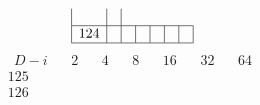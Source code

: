\documentclass{article}
\begin{document}
{$$\begin{array}{|r|*{6}{r|}}
 & 
\\
\hline
124 
 & 
 & 
 & 
 & 
 & 
 & 
\\
\hline
\end{array}
$$
$$
\begin{array}{|r|*{6}{r|}}
\hline
\ \ D-i \ \ &\ \ 2\ \ &\ \ 4\ \ &\ \ 8\ \ &\ \ 16\ \ &\ \ 32\ \ &\ \ 64\ \ \\
\hline
125 
 & 
 & 
 & 
 & 
 & 
 & 
\\
\hline
126 
 & 

\end{array}$$}
\end{document}
